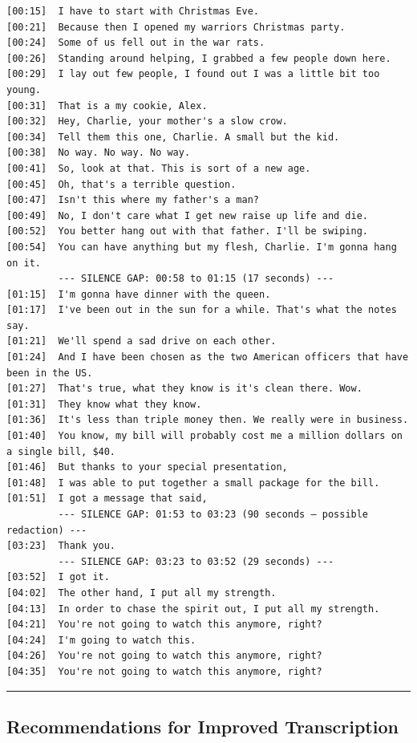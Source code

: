 \documentclass[
]{article}
\begin{document}
\begin{verbatim}
[00:15]  I have to start with Christmas Eve.
[00:21]  Because then I opened my warriors Christmas party.
[00:24]  Some of us fell out in the war rats.
[00:26]  Standing around helping, I grabbed a few people down here.
[00:29]  I lay out few people, I found out I was a little bit too young.
[00:31]  That is a my cookie, Alex.
[00:32]  Hey, Charlie, your mother's a slow crow.
[00:34]  Tell them this one, Charlie. A small but the kid.
[00:38]  No way. No way. No way.
[00:41]  So, look at that. This is sort of a new age.
[00:45]  Oh, that's a terrible question.
[00:47]  Isn't this where my father's a man?
[00:49]  No, I don't care what I get new raise up life and die.
[00:52]  You better hang out with that father. I'll be swiping.
[00:54]  You can have anything but my flesh, Charlie. I'm gonna hang on it.
         --- SILENCE GAP: 00:58 to 01:15 (17 seconds) ---
[01:15]  I'm gonna have dinner with the queen.
[01:17]  I've been out in the sun for a while. That's what the notes say.
[01:21]  We'll spend a sad drive on each other.
[01:24]  And I have been chosen as the two American officers that have been in the US.
[01:27]  That's true, what they know is it's clean there. Wow.
[01:31]  They know what they know.
[01:36]  It's less than triple money then. We really were in business.
[01:40]  You know, my bill will probably cost me a million dollars on a single bill, $40.
[01:46]  But thanks to your special presentation,
[01:48]  I was able to put together a small package for the bill.
[01:51]  I got a message that said,
         --- SILENCE GAP: 01:53 to 03:23 (90 seconds — possible redaction) ---
[03:23]  Thank you.
         --- SILENCE GAP: 03:23 to 03:52 (29 seconds) ---
[03:52]  I got it.
[04:02]  The other hand, I put all my strength.
[04:13]  In order to chase the spirit out, I put all my strength.
[04:21]  You're not going to watch this anymore, right?
[04:24]  I'm going to watch this.
[04:26]  You're not going to watch this anymore, right?
[04:35]  You're not going to watch this anymore, right?
\end{verbatim}

\begin{center}\rule{0.5\linewidth}{0.5pt}\end{center}

\subsection{Recommendations for Improved
Transcription}\label{recommendations-for-improved-transcription}
\end{document}
